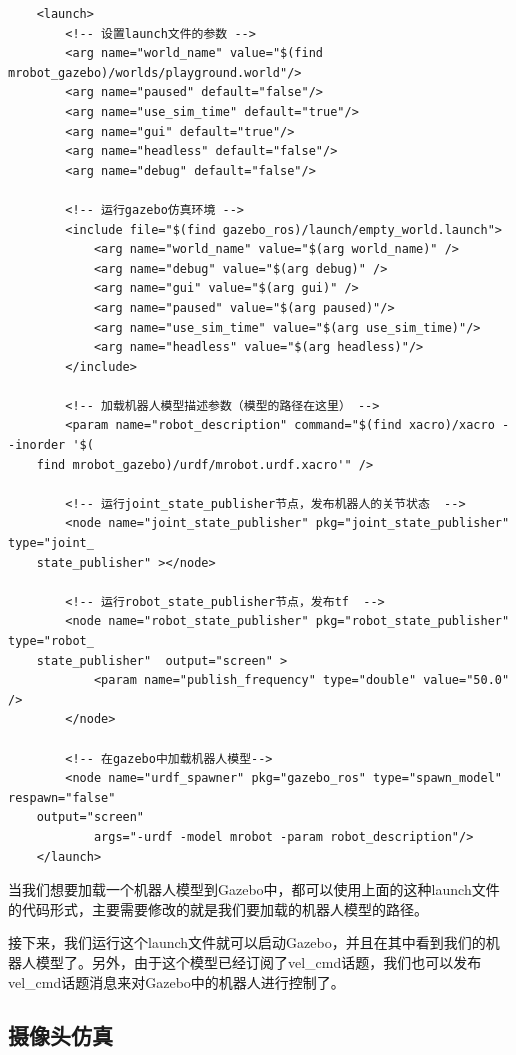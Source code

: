 \documentclass[10pt, oneside]{book}
\begin{document}
\begin{verbatim}
    <launch>
        <!-- 设置launch文件的参数 -->
        <arg name="world_name" value="$(find mrobot_gazebo)/worlds/playground.world"/>
        <arg name="paused" default="false"/>
        <arg name="use_sim_time" default="true"/>
        <arg name="gui" default="true"/>
        <arg name="headless" default="false"/>
        <arg name="debug" default="false"/>

        <!-- 运行gazebo仿真环境 -->
        <include file="$(find gazebo_ros)/launch/empty_world.launch">
            <arg name="world_name" value="$(arg world_name)" />
            <arg name="debug" value="$(arg debug)" />
            <arg name="gui" value="$(arg gui)" />
            <arg name="paused" value="$(arg paused)"/>
            <arg name="use_sim_time" value="$(arg use_sim_time)"/>
            <arg name="headless" value="$(arg headless)"/>
        </include>

        <!-- 加载机器人模型描述参数（模型的路径在这里） -->
        <param name="robot_description" command="$(find xacro)/xacro --inorder '$(
    find mrobot_gazebo)/urdf/mrobot.urdf.xacro'" /> 

        <!-- 运行joint_state_publisher节点，发布机器人的关节状态  -->
        <node name="joint_state_publisher" pkg="joint_state_publisher" type="joint_
    state_publisher" ></node> 

        <!-- 运行robot_state_publisher节点，发布tf  -->
        <node name="robot_state_publisher" pkg="robot_state_publisher" type="robot_
    state_publisher"  output="screen" >
            <param name="publish_frequency" type="double" value="50.0" />
        </node>

        <!-- 在gazebo中加载机器人模型-->
        <node name="urdf_spawner" pkg="gazebo_ros" type="spawn_model" respawn="false" 
    output="screen"
            args="-urdf -model mrobot -param robot_description"/> 
    </launch>
\end{verbatim}

当我们想要加载一个机器人模型到Gazebo中，都可以使用上面的这种launch文件的代码形式，主要需要修改的就是我们要加载的机器人模型的路径。

接下来，我们运行这个launch文件就可以启动Gazebo，并且在其中看到我们的机器人模型了。另外，由于这个模型已经订阅了vel\_cmd话题，我们也可以发布vel\_cmd话题消息来对Gazebo中的机器人进行控制了。

\subsection{摄像头仿真}
\end{document}
